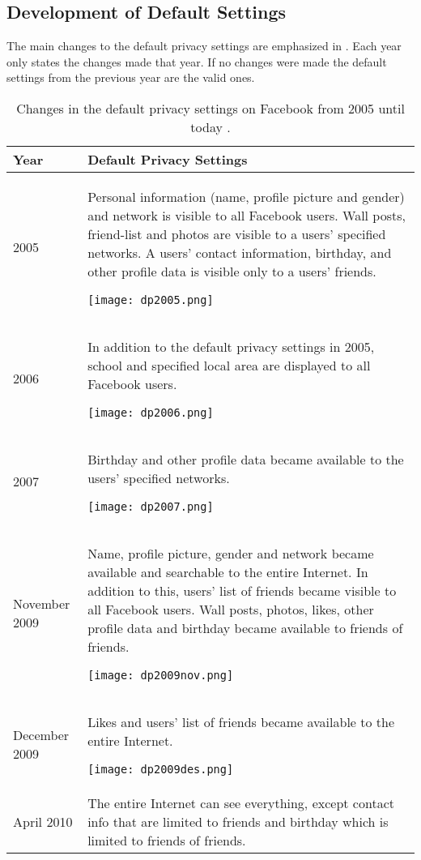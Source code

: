 \subsection{Development of Default Settings}

The main changes to the default privacy settings are emphasized in . Each year only states the changes made that year. If no changes were made the default settings from the previous year are the valid ones. 

\begin{center}
\begin{longtable}{ | p{1.3cm} | p{10.6cm} |}
\caption{\label{tab:dps}Changes in the default privacy settings on Facebook from 2005 until today \cite{EvoPriv,PrivTimeline}.}\\
    \hline
    \textbf{Year} & \textbf{Default Privacy Settings} \\ 
    \hline
    2005 & Personal information (name, profile picture and gender) and network is visible to all Facebook users. Wall posts, friend-list and photos are visible to a users' specified networks. A users' contact information, birthday, and other profile data is visible only to a users' friends. 
    
    \texttt{[image: dp2005.png]}\\ 
    \hline
    2006 & In addition to the default privacy settings in 2005, school and specified local area are displayed to all Facebook users.  
    
    \texttt{[image: dp2006.png]} \\ 
    \hline
    2007 & Birthday and other profile data became available to the users' specified networks. 
    
    \texttt{[image: dp2007.png]}\\
    \hline
    November 2009 & Name, profile picture, gender and network became 			available and searchable to the entire Internet. In addition to this, users' list of friends became visible to all Facebook users. Wall posts, photos, likes, other profile data and birthday became available to friends of friends. 
    
    \texttt{[image: dp2009nov.png]}\\
	\hline
    December 2009 & Likes and users' list of friends became available to the entire Internet. 
    
    \texttt{[image: dp2009des.png]}\\
    \hline
    April 2010 & The entire Internet can see everything, except contact info that are limited to friends and birthday which is limited to friends of friends.
    

\end{longtable}
\end{center}
